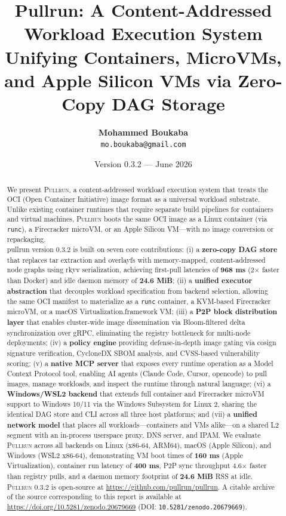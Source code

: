 \documentclass[11pt,a4paper]{article}
\title{\textbf{Pullrun: A Content-Addressed Workload Execution System}\\\large Unifying Containers, MicroVMs, and Apple Silicon VMs via Zero-Copy DAG Storage}
\author{
    \textbf{Mohammed Boukaba}\\
    \texttt{mo.boukaba@gmail.com}
}
\date{Version 0.3.2 --- June 2026}
\newcommand{\pullrun}{\textsc{Pullrun}}
\begin{document}
\sloppy
\maketitle

\begin{abstract}
We present \pullrun{}, a content-addressed workload execution system that treats the OCI (Open Container Initiative) image format as a universal workload substrate. Unlike existing container runtimes that require separate build pipelines for containers and virtual machines, \pullrun{} boots the same OCI image as a Linux container (via \texttt{runc}), a Firecracker microVM, or an Apple Silicon VM---with no image conversion or repackaging. \\pullrun{} version 0.3.2 is built on seven core contributions: (i) a \textbf{zero-copy DAG store} that replaces tar extraction and overlayfs with memory-mapped, content-addressed node graphs using rkyv serialization, achieving first-pull latencies of \textbf{968 ms} (2$\times$ faster than Docker) and idle daemon memory of \textbf{24.6 MiB}; (ii) a \textbf{unified executor abstraction} that decouples workload specification from backend selection, allowing the same OCI manifest to materialize as a \texttt{runc} container, a KVM-based Firecracker microVM, or a macOS Virtualization.framework VM; (iii) a \textbf{P2P block distribution layer} that enables cluster-wide image dissemination via Bloom-filtered delta synchronization over gRPC, eliminating the registry bottleneck for multi-node deployments; (iv) a \textbf{policy engine} providing defense-in-depth image gating via cosign signature verification, CycloneDX SBOM analysis, and CVSS-based vulnerability scoring; (v) a \textbf{native MCP server} that exposes every runtime operation as a Model Context Protocol tool, enabling AI agents (Claude Code, Cursor, opencode) to pull images, manage workloads, and inspect the runtime through natural language; (vi) a \textbf{Windows/WSL2 backend} that extends full container and Firecracker microVM support to Windows 10/11 via the Windows Subsystem for Linux 2, sharing the identical DAG store and CLI across all three host platforms; and (vii) a \textbf{unified network model} that places all workloads---containers and VMs alike---on a shared L2 segment with an in-process userspace proxy, DNS server, and IPAM. We evaluate \pullrun{} across all backends on Linux (x86-64, ARM64), macOS (Apple Silicon), and Windows (WSL2 x86-64), demonstrating VM boot times of \textbf{160 ms} (Apple Virtualization), container run latency of \textbf{400 ms}, P2P sync throughput 4.6$\times$ faster than registry pulls, and a daemon memory footprint of \textbf{24.6 MiB} RSS at idle. \pullrun{} 0.3.2 is open-source at \url{https://github.com/pullrun/pullrun}. A citable archive of the source corresponding to this report is available at \url{https://doi.org/10.5281/zenodo.20679669} (DOI: \texttt{10.5281/zenodo.20679669}).
\end{abstract}
\end{document}
